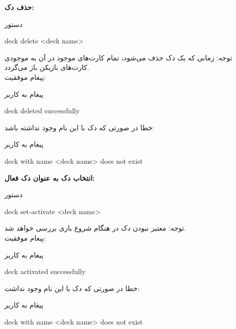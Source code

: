 \documentclass[]{article}
\begin{document}
\vspace{.5cm}
\textbf{حذف دک:}
\begin{mybox}[colback=yellow]{دستور}
	\begin{latin}	
		deck delete <deck name>
	\end{latin}
\end{mybox}
توجه: زمانی که یک دک حذف می‌شود، تمام کارت‌های موجود در آن به موجودی کارت‌های 
بازیکن باز می‌گردد.
\\
پیغام موفقیت:
\begin{mybox}[colback=yellow]{پیغام به کاربر}
	\begin{latin}	
		deck deleted successfully
	\end{latin}
\end{mybox}
خطا در صورتی که دک با این نام وجود نداشته باشد:
\begin{mybox}[colback=yellow]{پیغام به کاربر}
	\begin{latin}	
		deck with name <deck name> does not exist
	\end{latin}
\end{mybox}

\vspace{.5cm}
\textbf{انتخاب دک به عنوان دک فعال:}
\begin{mybox}[colback=yellow]{دستور}
	\begin{latin}	
		deck set-activate <deck name>
	\end{latin}
\end{mybox}
توجه: معتبر نبودن دک در هنگام شروع بازی بررسی خواهد شد.
\\
پیغام موفقیت:
\begin{mybox}[colback=yellow]{پیغام به کاربر}
	\begin{latin}	
		deck activated successfully
	\end{latin}
\end{mybox}
خطا در صورتی که دک با این نام وجود نداشت:
\begin{mybox}[colback=yellow]{پیغام به کاربر}
	\begin{latin}	
		deck with name <deck name> does not exist
	\end{latin}
\end{mybox}
\end{document}
